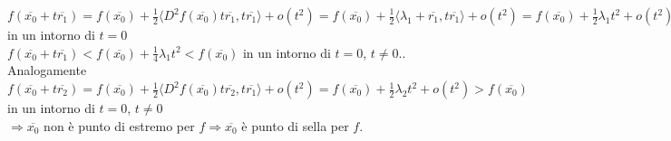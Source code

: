 \documentclass{article}
\begin{document}
\begin{enumerate}
    $f(\overline{x_0}+t\overline{r_1})=f(\overline{x_0})+\frac{1}{2}\langle D^2f(\overline{x_0})t\overline{r_1},t\overline{r_1} \rangle + o(t^2)=f(\overline{x_0})+\frac{1}{2}\langle \lambda_1 +\overline{r_1},t\overline{r_1}\rangle + o(t^2)=f(\overline{x_0})+\frac{1}{2}\lambda_1 t^2 + o(t^2)=f(\overline{x_0})+t^2(\frac{1}{2}\lambda_1+o(1)) \Rightarrow \frac{1}{2}\lambda_1+o(1) < \frac{1}{4}\lambda_1$ in un intorno di $t=0$\\
    $f(\overline{x_0}+t\overline{r_1})<f(\overline{x_0})+\frac{1}{4}\lambda_1 t^2< f(\overline{x_0})$ in un intorno di $t=0$, $t\neq 0$..\\
    Analogamente $f(\overline{x_0}+t\overline{r_2})=f(\overline{x_0})+\frac{1}{2}\langle D^2f(\overline{x_0})t\overline{r_2},t\overline{r_1} \rangle +o(t^2)=f(\overline{x_0})+\frac{1}{2}\lambda_2t^2+o(t^2)>f(\overline{x_0})$ in un intorno di $t=0$, $t \neq 0$\\
    $\Rightarrow \overline{x_0}$ non è punto di estremo per $f \Rightarrow \overline{x_0}$ è punto di sella per $f$. 
\end{enumerate}
\begin{flushright}
    \Lightning
\end{flushright}
\end{document}
